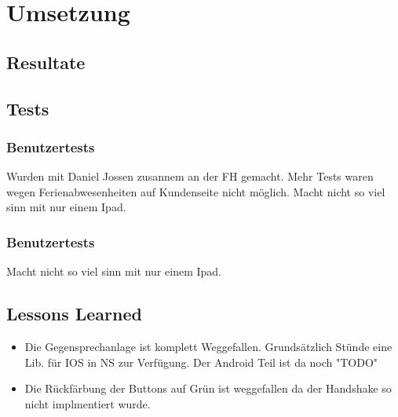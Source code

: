 \section{Umsetzung}\label{sec:umsetzung}

    \subsection{Resultate}

        
        
        
        






\subsection{Tests}

\subsubsection*{Benutzertests}
Wurden mit Daniel Jossen zusannem an der FH gemacht.
Mehr Tests waren wegen Ferienabwesenheiten auf Kundenseite nicht möglich.
Macht nicht so viel sinn mit nur einem Ipad.


\subsubsection*{Benutzertests}
Macht nicht so viel sinn mit nur einem Ipad.

\clearpage
\subsection{Lessons Learned}

\clearpage
\begin{itemize}
    \item Die Gegensprechanlage ist komplett Weggefallen.
    \subitem Grundsätzlich Stünde eine Lib. für IOS in NS zur Verfügung. Der Android Teil ist da noch "TODO"
    \item Die Rückfärbung der Buttons auf Grün ist weggefallen da der Handshake so nicht implmentiert wurde.
\end{itemize}


